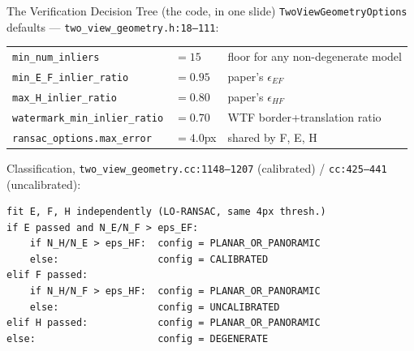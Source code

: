 \documentclass[11pt]{beamer}
\newcommand{\coderef}[1]{{\scriptsize\textcolor{blue!60!black}{\texttt{#1}}}}
\begin{document}
\begin{frame}[fragile]{The Verification Decision Tree (the code, in one slide)}
  \texttt{TwoViewGeometryOptions} defaults --- \coderef{two\_view\_geometry.h:18--111}:
  \begin{center}
  \scriptsize
  \begin{tabular}{lll}
    \toprule
    \texttt{min\_num\_inliers} & $=15$ & floor for any non-degenerate model \\
    \texttt{min\_E\_F\_inlier\_ratio} & $=0.95$ & paper's $\epsilon_{EF}$ \\
    \texttt{max\_H\_inlier\_ratio} & $=0.80$ & paper's $\epsilon_{HF}$ \\
    \texttt{watermark\_min\_inlier\_ratio} & $=0.70$ & WTF border+translation ratio \\
    \texttt{ransac\_options.max\_error} & $=4.0$px & shared by F, E, H \\
    \bottomrule
  \end{tabular}
  \end{center}
  Classification, \coderef{two\_view\_geometry.cc:1148--1207} (calibrated) / \coderef{cc:425--441} (uncalibrated):
  \begin{lstlisting}
fit E, F, H independently (LO-RANSAC, same 4px thresh.)
if E passed and N_E/N_F > eps_EF:
    if N_H/N_E > eps_HF:  config = PLANAR_OR_PANORAMIC
    else:                 config = CALIBRATED
elif F passed:
    if N_H/N_F > eps_HF:  config = PLANAR_OR_PANORAMIC
    else:                 config = UNCALIBRATED
elif H passed:            config = PLANAR_OR_PANORAMIC
else:                     config = DEGENERATE
  \end{lstlisting}
\end{frame}
\end{document}
